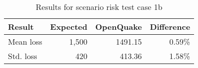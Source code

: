 \begin{table}[htbp]

\centering
\begin{tabular}{ l r r r }

\hline
\rowcolor{anti-flashwhite}
\bf{Result} & \bf{Expected} & \bf{OpenQuake} & \bf{Difference}\\
\hline
Mean loss & 1,500 & 1491.15 & 0.59\% \\
Std. loss & 420 & 413.36 & 1.58\% \\
\hline
\end{tabular}

\caption{Results for scenario risk test case 1b}
\label{tab:result-scenario-risk-1b}
\end{table}